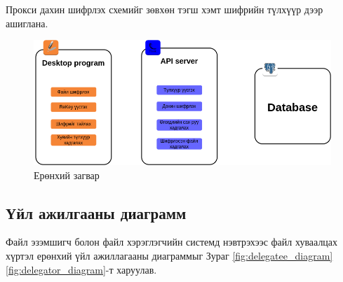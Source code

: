 Прокси дахин шифрлэх схемийг зөвхөн тэгш хэмт шифрийн түлхүүр дээр ашиглана.
\begin{figure}[ht]
    \centering
    \includegraphics[scale=0.5]{Figures/system_schemes/main_diagram.drawio.png}
    \caption{Ерөнхий загвар}
    \label{fig:main_scheme}
\end{figure}

\subsection*{Үйл ажилгааны диаграмм}
Файл эзэмшигч болон файл хэрэглэгчийн системд нэвтрэхээс файл хуваалцах хүртэл ерөнхий үйл ажиллагааны диаграммыг Зураг \ref{fig:delegatee_diagram} \ref{fig:delegator_diagram}-т харуулав.

